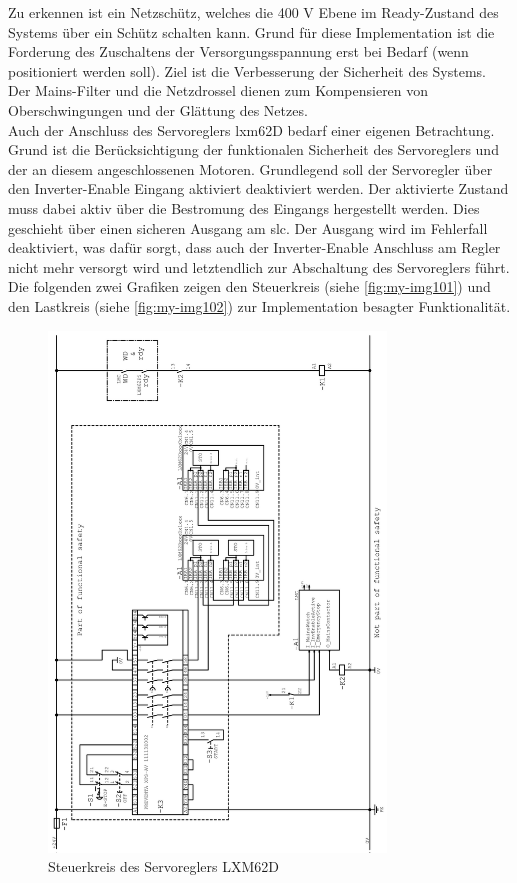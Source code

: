 \documentclass[../../../Bachelorarbeit.tex]{subfiles}
\begin{document}
Zu erkennen ist ein Netzschütz, welches die 400 \si{V} Ebene im Ready-Zustand des Systems über ein Schütz schalten kann. Grund für diese Implementation ist die Forderung des Zuschaltens der Versorgungsspannung erst bei Bedarf (wenn positioniert werden soll). Ziel ist die Verbesserung der Sicherheit des Systems. Der Mains-Filter und die Netzdrossel dienen zum Kompensieren von Oberschwingungen und der Glättung des Netzes.\\
\smallskip \newline
Auch der Anschluss des Servoreglers \acs{lxm}62D bedarf einer eigenen Betrachtung. Grund ist die Berücksichtigung der funktionalen Sicherheit des Servoreglers und der an diesem angeschlossenen Motoren. Grundlegend soll der Servoregler über den Inverter-Enable Eingang aktiviert \bzw deaktiviert werden. Der aktivierte Zustand muss dabei aktiv über die Bestromung des Eingangs hergestellt werden. Dies geschieht über einen sicheren Ausgang am \acs{slc}. Der Ausgang wird im Fehlerfall deaktiviert, was dafür sorgt, dass auch der Inverter-Enable Anschluss am Regler nicht mehr versorgt wird und letztendlich zur Abschaltung des Servoreglers führt. Die folgenden zwei Grafiken zeigen den Steuerkreis (siehe \autoref{fig:my-img101}) und den Lastkreis (siehe \autoref{fig:my-img102}) zur Implementation besagter Funktionalität.
\clearpage

\begin{figure}[H]
    \centering
    \includegraphics[width=0.8\textwidth]{Images/steuerkreis.jpg}
    \caption[Steuerkreis Servoregler]{Steuerkreis des Servoreglers LXM62D}
    \label{fig:my-img101}
\end{figure}
\end{document}
